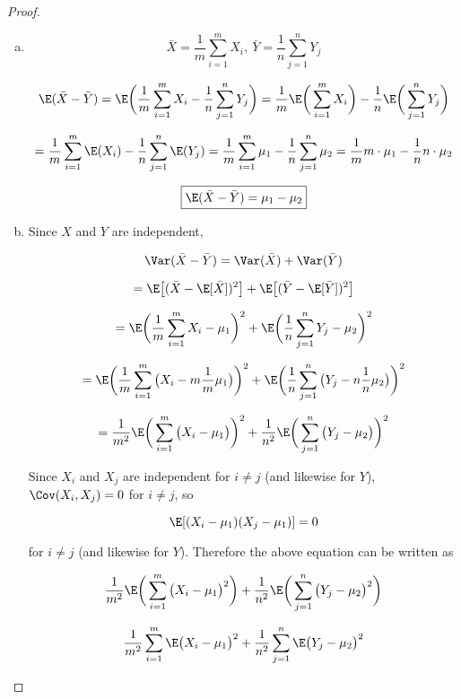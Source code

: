 \begin{proof}

\begin{enumerate}[a.]

\item

\[
\bar{X} = \frac{1}{m} \sum_{i=1}^m X_i, \ \bar{Y} = \frac{1}{n} \sum_{j=1}^n Y_j 
\]


\[
\E(\bar{X} - \bar{Y}) = \E\bigg(\frac{1}{m} \sum_{i=1}^m X_i - \frac{1}{n} \sum_{j=1}^n Y_j \bigg) = \frac{1}{m} \E\bigg( \sum_{i=1}^m X_i\bigg) - \frac{1}{n} \E \bigg(\sum_{j=1}^n Y_j \bigg)
\]

\[
= \frac{1}{m}  \sum_{i=1}^m \E (X_i)  - \frac{1}{n} \sum_{j=1}^n \E(Y_j) = \frac{1}{m}  \sum_{i=1}^m \mu_1  - \frac{1}{n} \sum_{j=1}^n \mu_2 = \frac{1}{m} m \cdot \mu_1 - \frac{1}{n} n \cdot \mu_2
\]

\[
\boxed{
\E(\bar{X} - \bar{Y}) = \mu_1 - \mu_2}
\]

\item 

Since \(X\) and \(Y\) are independent,

\[
\Var (\bar{X} - \bar{Y}) = \Var(\bar{X}) + \Var(\bar{Y})
\]

\[
= \E\big[ (\bar{X} - \E[\bar{X}])^2 \big] + \E\big[ (\bar{Y} - \E[\bar{Y}])^2 \big]
\]

\[
= \E\bigg( \frac{1}{m} \sum_{i=1}^m X_i - \mu_1 \bigg)^2 + \E\bigg( \frac{1}{n} \sum_{j=1}^n Y_j - \mu_2 \bigg)^2
\]

\[
= \E\bigg( \frac{1}{m} \sum_{i=1}^m \big(X_i - m \frac{1}{m} \mu_1\big) \bigg)^2 + \E\bigg( \frac{1}{n} \sum_{j=1}^n \big( Y_j - n \frac{1}{n} \mu_2 \big) \bigg)^2
\]

\[
= \frac{1}{m^2 }\E\bigg(\sum_{i=1}^m \big(X_i - \mu_1\big) \bigg)^2 + \frac{1}{n^2} \E\bigg(  \sum_{j=1}^n \big( Y_j - \mu_2 \big) \bigg)^2
\]

Since \(X_i\) and \(X_j\) are independent for \(i \neq j\) (and likewise for \(Y\)), \(\Cov(X_i, X_j) = 0\) for \(i \neq j\), so 

\[
\E[(X_i - \mu_1)(X_j - \mu_1)] = 0
\] 

for \(i \neq j\) (and likewise for \(Y\)). Therefore the above equation can be written as

\[
\frac{1}{m^2 }\E\bigg(\sum_{i=1}^m \big(X_i - \mu_1\big)^2 \bigg) + \frac{1}{n^2} \E\bigg(  \sum_{j=1}^n \big( Y_j - \mu_2 \big)^2 \bigg)
\]

\[
\frac{1}{m^2 }\sum_{i=1}^m \E \big(X_i - \mu_1\big)^2  + \frac{1}{n^2}   \sum_{j=1}^n \E \big( Y_j - \mu_2 \big)^2
\]


\end{enumerate}
\end{proof}
